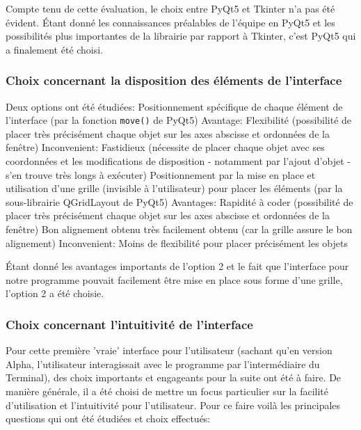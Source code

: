 \bigskip

Compte tenu de cette évaluation, le choix entre PyQt5 et Tkinter n’a pas été évident.
Étant donné les connaissances préalables de l'équipe en PyQt5 et les possibilités plus importantes
de la librairie par rapport à Tkinter, c’est PyQt5 qui a finalement été choisi.

\subsubsection{Choix concernant la disposition des éléments de l’interface}

Deux options ont été étudiées:
Positionnement spécifique de chaque élément de l’interface (par la fonction \texttt{move()} de PyQt5)
Avantage:    Flexibilité (possibilité de placer très précisément chaque objet sur les axes abscisse et ordonnées de la fenêtre)
Inconvenient:    Fastidieux (nécessite de placer chaque objet avec ses coordonnées et les modifications de disposition - notamment par l’ajout d’objet - s’en trouve très longs à exécuter)
Positionnement par la mise en place et utilisation d’une grille (invisible à l'utilisateur) pour placer les éléments (par la sous-librairie QGridLayout de PyQt5)
Avantages:    Rapidité à coder (possibilité de placer très précisément chaque objet sur les axes abscisse et ordonnées de la fenêtre)
Bon alignement obtenu très facilement obtenu (car la grille assure le bon alignement)
Inconvenient:    Moins de flexibilité pour placer précisément les objets

Étant donné les avantages importants de l’option 2 et le fait que l’interface pour notre programme pouvait facilement être mise en place sous forme d’une grille, l’option 2 a été choisie.


\subsubsection{Choix concernant l’intuitivité de l’interface}

Pour cette première 'vraie' interface pour l’utilisateur
(sachant qu’en version Alpha, l’utilisateur interagissait avec le programme par l'intermédiaire du Terminal),
des choix importants et engageants pour la suite ont été à faire. De manière générale,
il a été choisi de mettre un focus particulier sur la facilité d’utilisation et l’intuitivité pour l’utilisateur.
Pour ce faire voilà les principales questions qui ont été étudiées et  choix effectués:

